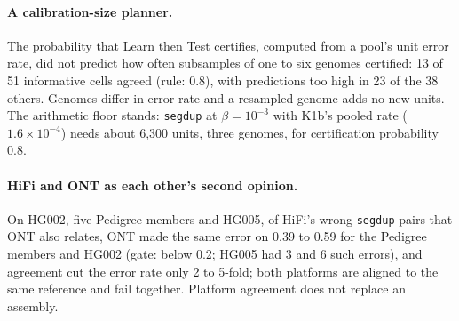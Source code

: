 \documentclass[11pt]{article}
\theoremstyle{definition}
\theoremstyle{remark}
\begin{document}
\paragraph{A calibration-size planner.} The probability that Learn then
Test certifies, computed from a pool's unit error rate, did not predict how
often subsamples of one to six genomes certified: 13 of 51 informative
cells agreed (rule: 0.8), with predictions too high in 23 of the 38 others.
Genomes differ in error rate and a resampled genome adds no new units. The
arithmetic floor stands: \texttt{segdup} at $\beta=10^{-3}$ with K1b's pooled
rate ($1.6\times10^{-4}$) needs about 6{,}300 units, three genomes, for
certification probability 0.8.

\paragraph{HiFi and ONT as each other's second opinion.} On HG002, five
Pedigree members and HG005, of HiFi's wrong \texttt{segdup} pairs that ONT
also relates, ONT made the same error on 0.39 to 0.59 for the Pedigree
members and HG002 (gate: below 0.2; HG005 had 3 and 6 such errors), and agreement cut the error rate only 2
to 5-fold; both platforms are aligned to the same reference and fail
together. Platform agreement does not replace an assembly.


\end{document}
